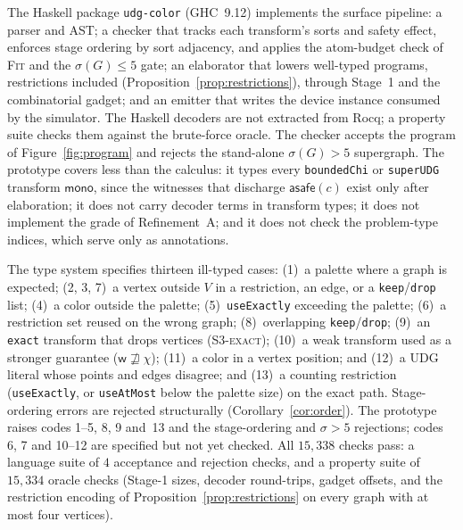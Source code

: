 \documentclass[a4paper,fleqn]{cas-sc}
\newcommand{\asafe}[1]{\textsf{asafe}(#1)}
\newcommand{\monoeff}{\textsf{mono}}
\newcommand{\rn}[1]{\textup{\textsc{\footnotesize #1}}}
\begin{document}
The Haskell package \texttt{udg-color} (GHC~9.12) implements the surface pipeline: a
parser and AST; a checker that tracks each transform's sorts and safety effect,
enforces stage ordering by sort adjacency, and applies the atom-budget check of
\rn{Fit} and the $\sigma(G)\le 5$ gate; an elaborator that lowers well-typed programs,
restrictions included (Proposition~\ref{prop:restrictions}), through Stage~1 and the
combinatorial gadget; and an emitter that writes the device instance consumed
by the simulator. The Haskell decoders are not extracted from Rocq; a property suite
checks them against the brute-force oracle. The checker accepts the program of
Figure~\ref{fig:program} and rejects the stand-alone $\sigma(G)>5$ supergraph. The
prototype covers less than the calculus: it types every \texttt{boundedChi} or
\texttt{superUDG} transform $\monoeff$, since the witnesses that discharge
$\asafe{c}$ exist only after elaboration; it does not carry decoder terms in
transform types; it does not implement the grade of Refinement~A; and it does not
check the problem-type indices, which serve only as annotations.

The type system specifies thirteen ill-typed cases: (1)~a palette where a graph is
expected; (2, 3, 7)~a vertex outside $V$ in a restriction, an edge, or a
\texttt{keep}/\texttt{drop} list; (4)~a color outside the palette;
(5)~\texttt{useExactly} exceeding the palette; (6)~a restriction set reused on the
wrong graph; (8)~overlapping \texttt{keep}/\texttt{drop}; (9)~an \texttt{exact}
transform that drops vertices (\rn{S3-exact}); (10)~a weak transform used as a stronger
guarantee ($\mathsf{w}\not\sqsupseteq\chi$); (11)~a color in a vertex position; and
(12)~a UDG literal whose points and edges disagree; and (13)~a counting restriction
(\texttt{useExactly}, or \texttt{useAtMost} below the palette size) on the exact path.
Stage-ordering errors are rejected structurally (Corollary~\ref{cor:order}). The
prototype raises codes 1--5, 8, 9 and~13 and the stage-ordering and $\sigma>5$
rejections; codes 6, 7 and 10--12 are specified but not yet checked. All $15{,}338$
checks pass: a language suite of $4$ acceptance and rejection checks, and a property
suite of $15{,}334$ oracle checks (Stage-1 sizes, decoder round-trips, gadget offsets,
and the restriction encoding of Proposition~\ref{prop:restrictions} on every graph
with at most four vertices).
\end{document}
